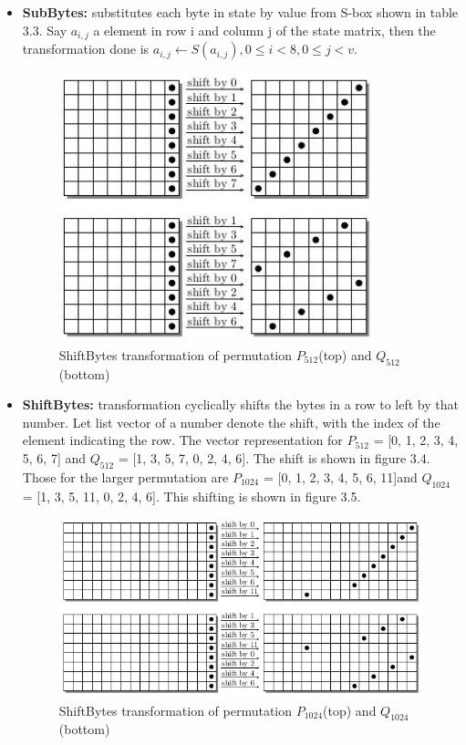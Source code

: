 \begin{itemize}
  \item {\bf SubBytes:} substitutes each byte in state by value from S-box shown in table 3.3.
  Say $a_{i,j}$ a element in row i and column j of the state matrix, then the transformation done is 
  $a_{i,j} \gets S( a_{i,j}),  0 \leq i < 8, 0 \leq j < v.$ 
  
  \begin{figure}
    \begin{center}
      \includegraphics[width=3.6in]{groestl512shift.jpg}
    \end{center}
    \caption{ShiftBytes transformation of permutation $P_{512}$(top) and $Q_{512}$(bottom)\cite{00019}}
    \label{fig:lab}
  \end{figure}

  \item {\bf ShiftBytes:} transformation cyclically shifts the bytes in a row to left by that number. Let list 
  vector of a number denote the shift, with the index of the element indicating the row. The vector representation
  for $P_{512}$ = [0, 1, 2, 3, 4, 5, 6, 7] and $Q_{512}$ = [1, 3, 5, 7, 0, 2, 4, 6]. The shift is shown in figure
  3.4. Those for the larger permutation are $P_{1024}$ = [0, 1, 2, 3, 4, 5, 6, 11]and $Q_{1024}$ = 
  [1, 3, 5, 11, 0, 2, 4, 6]. This shifting is shown in figure 3.5.
    
  \begin{figure}
    \begin{center}
      \includegraphics[width=6.4in]{groestl1024shift.jpg}
    \end{center}
    \caption{ShiftBytes transformation of permutation $P_{1024}$(top) and $Q_{1024}$(bottom)\cite{00019}}
    \label{fig:lab}
  \end{figure}


\end{itemize}
